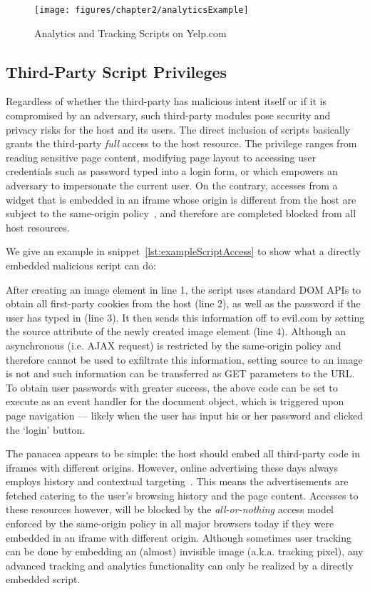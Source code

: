 \begin{figure}[bth]
\centering
\texttt{[image: figures/chapter2/analyticsExample]}
\caption{Analytics and Tracking Scripts on Yelp.com}
\label{fig:analyticsExample}
\end{figure}

\subsection{Third-Party Script Privileges}
Regardless of whether the third-party has malicious intent itself or if it is compromised by an adversary, such third-party modules pose security and privacy risks for the host and its users.  The direct inclusion of scripts basically grants the third-party \emph{full} access to the host resource.  The privilege ranges from reading sensitive page content, modifying page layout to accessing user credentials such as password typed into a login form, or  which empowers an adversary to impersonate the current user.  On the contrary, accesses from a widget that is embedded in an iframe whose origin is different from the host are subject to the same-origin policy~\cite{SOP}, and therefore are completed blocked from all host resources.

We give an example in snippet~\ref{lst:exampleScriptAccess} to show what a directly embedded malicious script can do:  



After creating an image element in line 1, the script uses standard DOM APIs to obtain all first-party cookies from the host (line 2), as well as the password if the user has typed in (line 3).  It then sends this information off to evil.com by setting the source attribute of the newly created image element (line 4).  Although an asynchronous  (i.e. AJAX request) is restricted by the same-origin policy and therefore cannot be used to exfiltrate this information, setting source to an image is not and such information can be transferred as GET parameters to the URL.  To obtain user passwords with greater success, the above code can be set to execute as an  event handler for the document object, which is triggered upon page navigation --- likely when the user has input his or her password and clicked the `login' button.

The panacea appears to be simple: the host should embed all third-party code in iframes with different origins.  However, online advertising these days always employs history and contextual targeting~\cite{Gill:2013:BPF:2504730.2504768}.  This means the advertisements are fetched catering to the user's browsing history and the page content.  Accesses to these resources however, will be blocked by the \emph{all-or-nothing} access model enforced by the same-origin policy in all major browsers today if they were embedded in an iframe with different origin.  Although sometimes user tracking can be done by embedding an (almost) invisible image (a.k.a. tracking pixel), any advanced tracking and analytics functionality can only be realized by a directly embedded script.  

